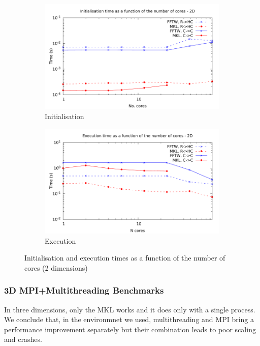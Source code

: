 \documentclass[12pt, a4paper]{article} \setlength{\textheight}{24cm}
\begin{document}
\begin{figure}[H]
  \centering
  \begin{subfigure}{.5\textwidth}
    \centering
    \includegraphics[width=.9\linewidth]{graphs/mpi-multh-init-2d.pdf}
    \caption{Initialisation}
    \label{2DMPIMULTHI}
  \end{subfigure}%
  \begin{subfigure}{.5\textwidth}
    \centering
    \includegraphics[width=.9\linewidth]{graphs/mpi-multh-exec-2d.pdf}
    \caption{Execution}
    \label{2DMPIMULTHE}
  \end{subfigure}
  \caption{Initialisation and execution times as a function of the
    number of cores (2 dimensions)}
  \label{2DMPIMULTH}
\end{figure}





\subsubsection{3D MPI+Multithreading Benchmarks}
In three dimensions, only the MKL works and it does only with a single
process. We conclude that, in the environmnet we used, multithreading
and MPI bring a performance improvement separately but their
combination leads to poor scaling and crashes.
\end{document}
